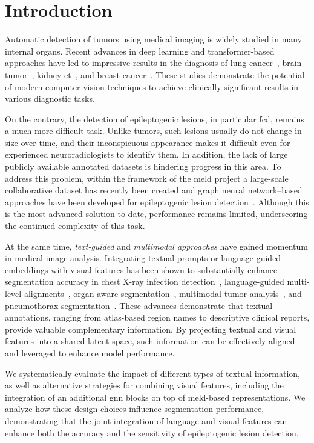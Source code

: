 \documentclass[FCD_GNN.tex]{subfiles}
\begin{document}
\chapter{Introduction}
Automatic detection of tumors using medical imaging is widely studied in many internal organs. 
Recent advances in deep learning and transformer-based approaches have led to impressive results in the diagnosis of lung cancer~\cite{Durgam2025LungCancer}, brain tumor~\cite{Abdusalomov2023BrainTumor}, kidney \ac{ct}~\cite{Sharma2025KidneyCT}, and breast cancer~\cite{Mehmood2025BreastCancer}. 
These studies demonstrate the potential of modern computer vision techniques to achieve clinically significant results in various diagnostic tasks.  

On the contrary, the detection of epileptogenic lesions, in particular \ac{fcd}, remains a much more difficult task. 
Unlike tumors, such lesions usually do not change in size over time, and their inconspicuous appearance makes it difficult even for experienced neuroradiologists to identify them. 
In addition, the lack of large publicly available annotated datasets is hindering progress in this area. 
To address this problem, within the framework of the \ac{meld} project a large-scale collaborative dataset has recently been created and graph neural network–based approaches have been developed for epileptogenic lesion detection~\cite{Ripart2025MELD}. 
Although this is the most advanced solution to date, performance remains limited, underscoring the continued complexity of this task.

At the same time, \textit{text-guided} and \textit{multimodal approaches} have gained momentum in medical image analysis. 
Integrating textual prompts or language-guided embeddings with visual features has been shown to substantially enhance segmentation accuracy in chest X-ray infection detection~\cite{Zhong2023Ariadne}, 
language-guided multi-level alignments~\cite{Li2024LGMSeg}, organ-aware segmentation~\cite{Zhang2025OrganAware}, multimodal tumor analysis~\cite{Li2025Mulmodseg}, 
and pneumothorax segmentation~\cite{Huemann2024ConTEXTualNet}. 
These advances demonstrate that textual annotations, ranging from atlas-based region names to descriptive clinical reports, provide valuable complementary information. 
By projecting textual and visual features into a shared latent space, such information can be effectively aligned and leveraged to enhance model performance.

We systematically evaluate the impact of different types of textual information, as well as alternative strategies 
for combining visual features, including the integration of an additional \ac{gnn} blocks on top of \ac{meld}-based representations. 
We analyze how these design choices influence segmentation performance, demonstrating that the joint integration 
of language and visual features can enhance both the accuracy and the sensitivity of epileptogenic lesion detection.
\end{document}

